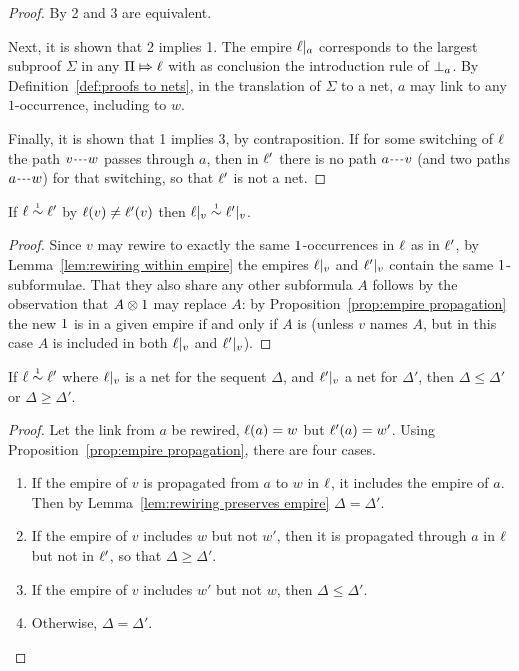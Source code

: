 \documentclass{lmcs}
\begin{document}
\begin{proof}
By \cite[Proposition 2.a]{Bellin-vandeWiele-1995} 2 and 3 are equivalent.

Next, it is shown that 2 implies 1.
%
The empire $\emp a$ corresponds to the largest subproof $\Sigma$ in any $\Pi\Mapsto\ell$ with as conclusion the introduction rule of $\bot_{a}$.
%
By Definition~\ref{def:proofs to nets}, in the translation of $\Sigma$ to a net, $a$ may link to any $1$-occurrence, including to $w$.


Finally, it is shown that 1 implies 3, by contraposition.
%
If for some switching of $\ell$ the path $\path vw$ passes through $a$, then in $\ell'$ there is no path $\path av$ (and two paths $\path aw$) for that switching, so that $\ell'$ is not a net.
%
\end{proof}

\begin{lemma}
\label{lem:rewiring preserves empire}
If $\links\perm*\links'$ by $\ell(v)\neq\ell'(v)$ then $\emp v\perm*\emp*v$.
\end{lemma}

\begin{proof}
Since $v$ may rewire to exactly the same $1$-occurrences in $\ell$ as in $\ell'$, by Lemma~\ref{lem:rewiring within empire} the empires $\emp v$ and $\emp*v$ contain the same $1$-subformulae.
%
That they also share any other subformula $A$ follows by the observation that $A\otimes1$ may replace $A$: by Proposition~\ref{prop:empire propagation} the new $1$ is in a given empire if and only if $A$ is (unless $v$ names $A$, but in this case $A$ is included in both $\emp v$ and $\emp*v$).
%
\end{proof}


\begin{lemma}
\label{lem:rewiring affects empires}
If $\links\perm*\links'$ where $\emp v$ is a net for the sequent $\Delta$, and $\emp*v$ a net for $\Delta'$, then $\Delta\leq\Delta'$ or $\Delta\geq\Delta'$.
\end{lemma}


\begin{proof}
Let the link from $a$ be rewired, $\ell(a)=w$ but $\ell'(a)=w'$.
%
Using Proposition~\ref{prop:empire propagation}, there are four cases.
%
\begin{enumerate}
	\item
If the empire of $v$ is propagated from $a$ to $w$ in $\ell$, it includes the empire of $a$.
%
Then by Lemma~\ref{lem:rewiring preserves empire} $\Delta=\Delta'$.

	\item
If the empire of $v$ includes $w$ but not $w'$, then it is propagated through $a$ in $\ell$ but not in $\ell'$, so that $\Delta\geq\Delta'$.

	\item
If the empire of $v$ includes $w'$ but not $w$, then $\Delta\leq\Delta'$.

	\item
Otherwise, $\Delta=\Delta'$. \hfill\qedhere
\end{enumerate}
\end{proof}
\end{document}
